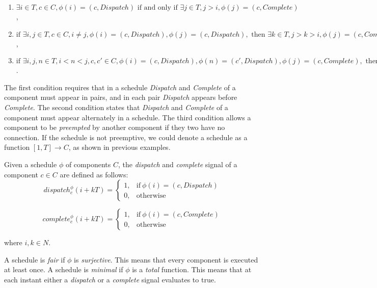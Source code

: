 \begin{enumerate}
	\item $ \exists i\in T, c\in C, \phi(i) = (c, Dispatch) \text{ if and only if } \exists j\in T, j > i, \phi(j) =  (c, Complete) $,
	\item $ \text{if } \exists i, j\in T, c\in C, i \neq j, \phi(i) = (c, Dispatch), \phi(j) = (c, Dispatch), \text{ then } \exists k\in T, j >k> i, \phi(j) =  (c, Complete) $,
	\item $ \text{if } \exists i, j, n\in T, i < n < j, c, c'\in C, \phi(i) = (c, Dispatch), \phi(n) = (c', Dispatch), \phi(j) = (c, Complete), \text{ then } c, c' \text{ are not connected, and }\exists m\in T, n < m < j, \phi(m) =  (c', Complete) $.
\end{enumerate}

The first condition requires that in a schedule \emph{Dispatch} and \emph{Complete} of a component must appear in pairs, and in each pair \emph{Dispatch} appears before \emph{Complete}. 
The second condition states that \emph{Dispatch} and \emph{Complete} of a component must appear alternately in a schedule. 
The third condition allows a component to be \emph{preempted} by another component if they two have no connection.
If the schedule is not preemptive, we could denote a schedule as a function $[1, T] \rightarrow C$, as shown in previous examples.

Given a schedule $\phi$ of components $C$, the \emph{dispatch} and \emph{complete} signal of a component $c \in C$ are defined as follows: 
\begin{equation}
\label{eqn:dispatch}
    dispatch_c^\phi(i+kT) =
    \begin{cases}
      1, & \text{if}\ \phi(i) = (c, Dispatch) \\
      0, & \text{otherwise}
    \end{cases}
\end{equation}

\begin{equation}
\label{eqn:complete}
    complete_c^\phi(i+kT) =
    \begin{cases}
      1, & \text{if}\ \phi(i) = (c, Complete) \\
      0, & \text{otherwise}
    \end{cases}
\end{equation}

where $i,k\in N$. 

A schedule is \emph{fair} if $\phi$ is \emph{surjective}. This means that every component is executed at least once.
A schedule is \emph{minimal} if $\phi$ is a \emph{total} function. This means that at each instant either a \emph{dispatch} or a \emph{complete} signal evaluates to true. 

